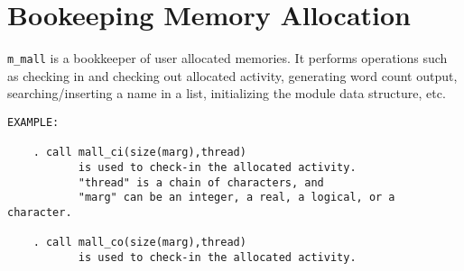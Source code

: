 %  
%  
%  
%
\section{Bookeeping Memory Allocation}
%
{\tt m\_mall} is a bookkeeper of user allocated memories.
It performs operations such as checking in and checking out allocated 
activity, generating word count output, searching/inserting a name in a list,
initializing the module data structure, etc.
%
\begin{verbatim}
EXAMPLE:

    . call mall_ci(size(marg),thread)
           is used to check-in the allocated activity.
           "thread" is a chain of characters, and
           "marg" can be an integer, a real, a logical, or a character.

    . call mall_co(size(marg),thread)
           is used to check-in the allocated activity.
\end{verbatim}
